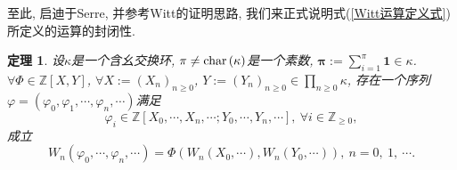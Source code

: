 \documentclass[UTF8, twoside]{ctexart}
\theoremstyle{nonumberplain}
\theoremstyle{nonumberplain}
\theoremstyle{plain}
\newtheorem{dingli4}[dingyi4]{定理}
\begin{document}
	至此, 启迪于Serre\cite[Chapter 2, \S~6, Theorem~6.]{serre}, 并参考Witt\cite[Satz 1.]{Witt}的证明思路, 我们来正式说明式(\ref{Witt运算定义式})所定义的运算的封闭性. 
	\begin{dingli4}
		设$\kappa $是一个含幺交换环, $\pi \ne \textup{char}\left( \kappa \right)$是一个素数, 
		$\bm{\pi} :=\sum_{i=1}^{\pi }{\bm{1}\in \kappa }$.
		$\forall \Phi \in \mathbb{Z}\left[ X,Y \right]$, $\forall X:={{\left( {{X}_{n}} \right)}_{n\ge 0}}$, $Y:={{\left( {{Y}_{n}} \right)}_{n\ge 0}}\in \prod_{n\ge 0}^{{}}{\kappa }$, 存在一个序列$\varphi = \left( {{\varphi }_{0}},{{\varphi }_{1}},\cdots ,{{\varphi }_{n}},\cdots  \right)$满足
		\[
			{{\varphi }_{i}}\in \mathbb{Z}\left[ {{X}_{0}},\cdots ,{{X}_{n}},\cdots ;{{Y}_{0}},\cdots ,{{Y}_{n}},\cdots  \right],\ \forall i\in {{\mathbb{Z}}_{\ge 0}},
		\]
		成立
		\[
			{{W}_{n}}\left( {{\varphi }_{0}},\cdots ,{{\varphi }_{n}},\cdots  \right)=\Phi \left( {{W}_{n}}\left( {{X}_{0}},\cdots  \right),{{W}_{n}}\left( {{Y}_{0}},\cdots  \right) \right),\ n=0,\ 1,\ \cdots .
		\]
	\end{dingli4}
\end{document}
